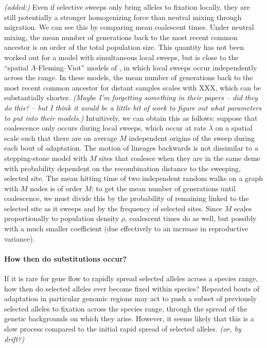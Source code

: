 \documentclass{article}
\newcommand{\plr}[1]{{\it\color{blue}(#1)}}
\begin{document}

\plr{added:}
Even if selective sweeps only bring alleles to fixation locally,
they are still potentially a stronger homogenizing force
than neutral mixing through migration.
We can see this by comparing mean coalescent times.
Under neutral mixing, the mean number of generations back to the most recent common ancestor
is on order of the total population size.
This quantity has not been worked out for a model with simultaneous local sweeps,
but is close to the ``spatial $\Lambda$-Fleming--Viot'' models of \citet{barton2013modelling},
in which local sweeps occur independently across the range.
In these models, the mean number of generations back to the most recent common ancestor for distant samples
scales with XXX,
which can be substantially shorter.
\plr{Maybe I'm forgetting something in their papers -- did they do this? --
but I think it would be a little bit of work to figure out what parameters to put into their models.}
Intuitively, we can obtain this as follows:
suppose that coalescence only occurs during local sweeps,
which occur at rate $\lambda$
on a spatial scale such that there are on average $M$ independent origins of the sweep during each bout of adaptation.
The motion of lineages backwards is not dissimilar to a stepping-stone model with $M$ sites
that coalesce when they are in the same deme
with probability dependent on the recombination distance to the sweeping, selected site.
The mean hitting time of two independent random walks on a graph with $M$ nodes is of order $M$;
to get the mean number of generations until coalescence, 
we must divide this by the probability of remaining linked to the selected site as it sweeps
and by the frequency of selected sites.
Since $M$ scales proportionally to population density $\rho$,
coalescent times do as well,
but possibly with a much smaller coefficient
(due effectively to an increase in reproductive variance).


\paragraph{How then do substitutions occur?}
If it is rare for gene flow to rapidly spread selected alleles across a species range, 
how then do selected alleles ever become fixed within species? 
Repeated bouts of adaptation in particular genomic regions may act 
to push a subset of previously selected alleles to fixation across the
species range, through the spread of the genetic backgrounds on which they arise.  
However, it seems likely that this is a slow process compared to the
initial rapid spread of selected alleles.
\plr{or, by drift?}
\end{document}
